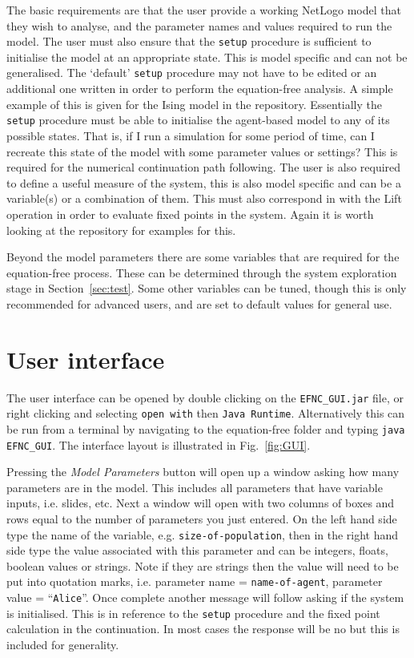 \documentclass[11pt]{article}
\begin{document}
The basic requirements are that the user provide a working NetLogo model that they wish to analyse, and the parameter names and values required to run the model. The user must also ensure that the {\tt setup} procedure is sufficient to initialise the model at an appropriate state. This is model specific and can not be generalised. The `default' {\tt setup} procedure may not have to be edited or an additional one written in order to perform the equation-free analysis. A simple example of this is given for the Ising model in the repository. Essentially the {\tt setup} procedure must be able to initialise the agent-based model to any of its possible states. That is, if I run a simulation for some period of time, can I recreate this state of the model with some parameter values or settings? This is required for the numerical continuation path following. The user is also required to define a useful measure of the system, this is also model specific and can be a variable(s) or a combination of them. This must also correspond in with the Lift operation in order to evaluate fixed points in the system. Again it is worth looking at the repository for examples for this. 

Beyond the model parameters there are some variables that are required for the equation-free process. These can be determined through the system exploration stage in Section~\ref{sec:test}. Some other variables can be tuned, though this is only recommended for advanced users, and are set to default values for general use. 


\section{User interface}
\label{sec:GUI}
The user interface can be opened by double clicking on the {\tt EFNC\_GUI.jar} file, or right clicking and selecting {\tt open with} then {\tt Java Runtime}. Alternatively this can be run from a terminal by navigating to the equation-free folder and typing {\tt java EFNC\_GUI}. The interface layout is illustrated in Fig.~\ref{fig:GUI}. 

Pressing the {\it Model Parameters} button will open up a window asking how many parameters are in the model. This includes all parameters that have variable inputs, i.e. slides, etc. Next a window will open with  two columns of boxes and rows equal to the number of parameters you just entered. On the left hand side type the name of the variable, e.g. {\tt size-of-population}, then in the right hand side type the value associated with this parameter and can be integers, floats, boolean values or strings. Note if they are strings then the value will need to be put into quotation marks, i.e. parameter name = {\tt name-of-agent}, parameter value = ``{\tt Alice}''. Once complete another message will follow asking if the system is initialised. This is in reference to the {\tt setup} procedure and the fixed point calculation in the continuation. In most cases the response will be no but this is included for generality. 
\end{document}
